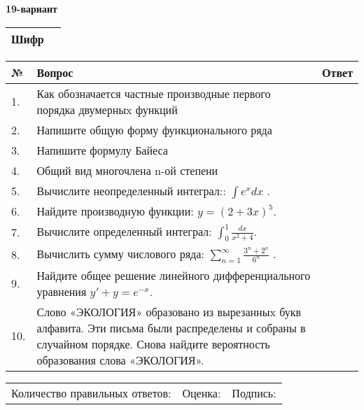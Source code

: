 \documentclass{article}
\begin{document}
  \egroup
  
  \newpage
  
  
  \textbf{19-вариант}\\
  
  \bgroup
  \def\arraystretch{1.6} %
  
  \begin{tabular}{|m{5.7cm}|m{9.5cm}|}
  \hline
  Шифр & \\
  \hline
  \end{tabular}
  
  \vspace{1cm}
  
  \begin{tabular}{|m{0.7cm}|m{10cm}|m{4cm}|}
  \hline
  № & Вопрос & Ответ \\
  \hline
  1. & Как обозначается частные производные первого порядка двумерныx функций &  \\
  \hline
  2. & Напишите общую форму функционального ряда &  \\
  \hline
  3. & Напишите формулу Байеса &  \\
  \hline
  4. & Общий вид многочлена n-ой степени &  \\
  \hline
  5. & Вычислите неопределенный интеграл:: \(\int{e^{x}dx}\) . &  \\
  \hline
  6. & Найдите производную функции: \(y = (2 + 3x)^{5}\). &  \\
  \hline
  7. & Вычислите определенный интеграл: \(\int_{0}^{1}\frac{dx}{x^{2} + 4}\). &  \\
  \hline
  8. & Вычислить сумму числового ряда: \(\sum_{n = 1}^{\infty}\frac{3^{n} + 2^{n}}{6^{n}}\) . &  \\
  \hline
  9. & Найдите общее решение линейного дифференциального уравнения \(y' + y = e^{- x}\). &  \\
  \hline
  10. & Слово «ЭКОЛОГИЯ» образовано из вырезанныx букв алфавита. Эти письма были распределены и собраны в случайном порядке. Снова найдите вероятность образования слова «ЭКОЛОГИЯ». &  \\
  \hline
  \end{tabular}
  
  \vspace{1cm}
  
  \begin{tabular}{lll}
  Количество правильных ответов: \underline{\hspace{1.5cm}} & 
  Оценка: \underline{\hspace{1.5cm}} & 
  Подпись: \underline{\hspace{2cm}} \\
  \end{tabular}
  
\end{document}
